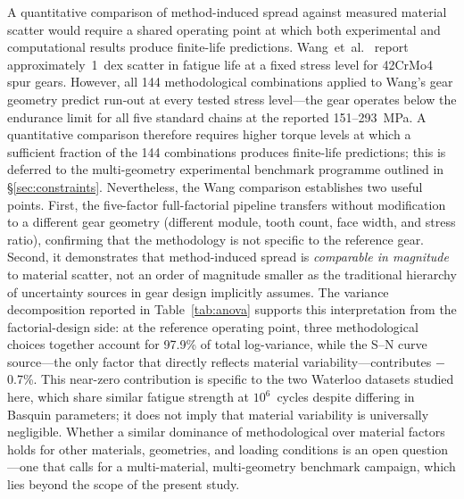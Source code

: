 \documentclass[12pt,a4paper]{article}
\begin{document}
A quantitative comparison of method-induced spread against measured
material scatter would require a shared operating point at which both
experimental and computational results produce finite-life predictions.
Wang~et~al.~\cite{wang2023} report approximately~1~dex scatter in
fatigue life at a fixed stress level for 42CrMo4 spur gears. However,
all 144 methodological combinations applied to Wang's gear geometry
predict run-out at every tested stress level---the gear operates below
the endurance limit for all five standard chains at the reported
151--293~MPa. A quantitative comparison therefore requires higher
torque levels at which a sufficient fraction of the 144 combinations
produces finite-life predictions; this is deferred to the
multi-geometry experimental benchmark programme outlined in
\S\ref{sec:constraints}.
Nevertheless, the Wang comparison establishes two useful points.
First, the five-factor full-factorial pipeline transfers without
modification to a different gear geometry (different module, tooth
count, face width, and stress ratio), confirming that the methodology
is not specific to the reference gear. Second, it demonstrates that
method-induced spread is \emph{comparable in magnitude} to material
scatter, not an order of magnitude smaller as the traditional
hierarchy of uncertainty sources in gear design implicitly assumes.
The variance decomposition reported in Table~\ref{tab:anova} supports
this interpretation from the factorial-design side: at the reference
operating point, three methodological choices together account for
97.9\% of total log-variance, while the S--N curve source---the only
factor that directly reflects material variability---contributes
$-$0.7\%. This near-zero contribution is specific to the two Waterloo
datasets studied here, which share similar fatigue strength at
$10^6$~cycles despite differing in Basquin parameters; it does not
imply that material variability is universally negligible. Whether a
similar dominance of methodological over material factors holds for
other materials, geometries, and loading conditions is an open
question---one that calls for a multi-material, multi-geometry
benchmark campaign, which lies beyond the scope of the present study.
\end{document}
